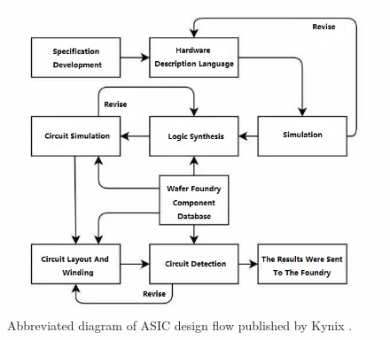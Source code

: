 
\begin{figure}[t]
    \centering
    \includegraphics[width=0.7\linewidth]{media/graphics/asic_flow.jpg}
    \caption[
        Abbreviated diagram of ASIC design flow
    ]{
        Abbreviated diagram of ASIC design flow published by Kynix \cite{kynixDesignFlow}.
    }
    \label{fig:asic_flow}
\end{figure}
